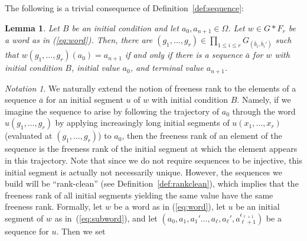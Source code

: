 \documentclass{article}
\newtheorem{lemma}[theorem]{Lemma}
\theoremstyle{remark}
\newtheorem{notation}[theorem]{Notation}
\theoremstyle{definition}
\newcommand{\remmic}[1]{\textcolor{orange}{MP: #1}}
\newcommand{\repau}[1]{\textcolor{ForestGreen}{PM: #1}}
\begin{document}
{The following is a trivial consequence of Definition~\ref{def:sequence}: 
\begin{lemma}\label{lem:sequences} Let $B$ be {an} initial condition and let $a_0, a_{n+1}\in\Omega$. Let $w\in G*F_r$ be a %
{word} as in (\ref{eq:word}). Then, there are $(g_1, \dots, g_r)\in {\prod_{1\leq i\leq r} G_{(\bar{b}_i, \bar{b}_i')}}$ such that $w(g_1, \dots, g_r)(a_0)=a_{n+1}$ if and only if there is a sequence $\bar{a}$ for $w$ with initial condition $B$, initial value $a_0$, and terminal value $a_{n+1}$.
\end{lemma}





\begin{notation} We naturally extend the notion of freeness rank 
to the elements of a sequence $\overline{a}$ for an initial segment $u$ of $w$ with initial condition $B$. Namely, if we imagine the sequence to arise by following the trajectory of $a_0$ through the word $u(g_1,\ldots,g_r)$ by applying increasingly long initial segments of $u(x_1,\ldots,x_r)$ (evaluated at $(g_1,\ldots,g_r)$) to $a_0$, then the freeness rank of an element of the sequence is the freeness rank of the initial segment at which the element appears in this trajectory. Note that since we do not require sequences to be injective, this initial segment  is actually not necessarily unique. However, the sequences we build will be ``rank-clean'' (see Definition~\ref{def:rankclean}), which implies that the freeness rank of %
all initial segments yielding the same value have the same freeness rank. %
Formally, let  $w$ be a word as in (\ref{eq:word}), let $u$ be an initial segment of $w$ as in~(\ref{eq:subword}), and let $(a_0, a_1, a_1'\dots, a_\ell, a_\ell', a^{\epsilon_{\ell+1}}_{\ell+1})$ be a sequence for $u$. Then we set  
\begin{align}

\end{align}
\end{notation}}
\end{document}
